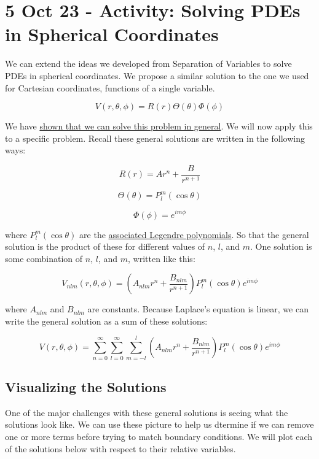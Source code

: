 \section{5 Oct 23 - Activity: Solving PDEs in Spherical
Coordinates}\label{oct-23---activity-solving-pdes-in-spherical-coordinates}

We can extend the ideas we developed from Separation of Variables to
solve PDEs in spherical coordinates. We propose a similar solution to
the one we used for Cartesian coordinates, functions of a single
variable.

\[V(r,\theta,\phi) = R(r) \Theta(\theta) \Phi(\phi)\]

We have
\href{../../assets/notes/Notes-Separation_of_Variables_Spherical.pdf}{shown
that we can solve this problem in general}. We will now apply this to a
specific problem. Recall these general solutions are written in the
following ways:

\[R(r) = A r^n + \frac{B}{r^{n+1}}\]

\[\Theta(\theta) = P^m_l(\cos\theta)\]

\[\Phi(\phi) = e^{i m \phi}\]

where \(P^m_l(\cos\theta)\) are the
\href{https://en.wikipedia.org/wiki/Associated_Legendre_polynomials}{associated
Legendre polynomials}. So that the general solution is the product of
these for different values of \(n\), \(l\), and \(m\). One solution is
some combination of \(n\), \(l\), and \(m\), written like this:

\[V_{nlm}(r,\theta,\phi) = \left(A_{nlm} r^n + \frac{B_{nlm}}{r^{n+1}}\right) P^m_l(\cos\theta) e^{i m \phi}\]

where \(A_{nlm}\) and \(B_{nlm}\) are constants. Because Laplace's
equation is linear, we can write the general solution as a sum of these
solutions:

\[V(r,\theta,\phi) = \sum_{n=0}^\infty \sum_{l=0}^\infty \sum_{m=-l}^l \left(A_{nlm} r^n + \frac{B_{nlm}}{r^{n+1}}\right) P^m_l(\cos\theta) e^{i m \phi}\]

\subsection{Visualizing the Solutions}\label{visualizing-the-solutions}

One of the major challenges with these general solutions is seeing what
the solutions look like. We can use these picture to help us dtermine if
we can remove one or more terms before trying to match boundary
conditions. We will plot each of the solutions below with respect to
their relative variables.


